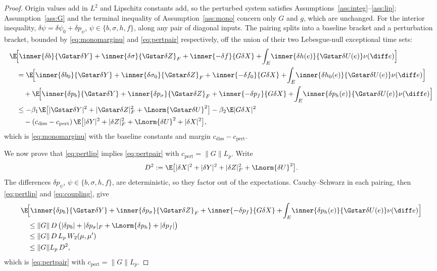 \begin{proof}
Origin values add in $L^2$ and Lipschitz constants add, so the perturbed system satisfies
Assumptions~\ref{ass:integ}--\ref{ass:lip}; Assumption~\ref{ass:G} and the terminal
inequality of Assumption~\ref{ass:mono} concern only $G$ and $g$, which are unchanged.
For the interior inequality, $\delta\psi=\delta\psi_0+\delta p_\psi$,
$\psi\in\{b,\sigma,h,f\}$, along any pair of diagonal inputs.
The pairing splits into a baseline bracket and a perturbation bracket, bounded by
\eqref{eq:monomarginu} and \eqref{eq:pertpair} respectively, off the union of their two
Lebesgue-null exceptional time sets:
\[
\begin{aligned}
&\E\!\Big[\inner{\delta b}{\Gstar\delta Y}+\inner{\delta\sigma}{\Gstar\delta Z}_F
+\inner{-\delta f}{G\delta X}+\!\int_E\!\inner{\delta h(e)}{\Gstar\delta U(e)}\nu(\diff e)\Big]\\
&\quad=\E\!\Big[\inner{\delta b_0}{\Gstar\delta Y}+\inner{\delta\sigma_0}{\Gstar\delta Z}_F
+\inner{-\delta f_0}{G\delta X}+\!\int_E\!\inner{\delta h_0(e)}{\Gstar\delta U(e)}\nu(\diff e)\Big]\\
&\qquad+\E\!\Big[\inner{\delta p_b}{\Gstar\delta Y}+\inner{\delta p_\sigma}{\Gstar\delta Z}_F
+\inner{-\delta p_f}{G\delta X}+\!\int_E\!\inner{\delta p_h(e)}{\Gstar\delta U(e)}\nu(\diff e)\Big]\\
&\quad\le-\beta_1\E\big[|\Gstar\delta Y|^2+|\Gstar\delta Z|_F^2+\Lnorm{\Gstar\delta U}^2\big]-\beta_2\E|G\delta X|^2\\
&\qquad-(c_{\mathrm{diss}}-c_{\mathrm{pert}})\,\E\big[|\delta Y|^2+|\delta Z|_F^2+\Lnorm{\delta U}^2+|\delta X|^2\big] ,
\end{aligned}
\]
which is \eqref{eq:monomarginu} with the baseline constants and margin
$c_{\mathrm{diss}}-c_{\mathrm{pert}}$.

We now prove that \eqref{eq:pertlip} implies \eqref{eq:pertpair} with
$c_{\mathrm{pert}}=\|G\|L_p$. Write
\[
D^2:=\E\big[|\delta X|^2+|\delta Y|^2+|\delta Z|_F^2+\Lnorm{\delta U}^2\big].
\]
The differences $\delta p_\psi$,
$\psi\in\{b,\sigma,h,f\}$, are deterministic, so they factor out of the expectations.
Cauchy--Schwarz in each pairing, then \eqref{eq:pertlip} and \eqref{eq:coupling}, give
\[
\begin{aligned}
&\E\!\Big[\inner{\delta p_b}{\Gstar\delta Y}+\inner{\delta p_\sigma}{\Gstar\delta Z}_F
+\inner{-\delta p_f}{G\delta X}+\!\int_E\!\inner{\delta p_h(e)}{\Gstar\delta U(e)}\nu(\diff e)\Big]\\
&\quad\le\|G\|\,D\,\bigl(|\delta p_b|+|\delta p_\sigma|_F+\Lnorm{\delta p_h}+|\delta p_f|\bigr)\\
&\quad\le\|G\|\,D\,L_p\,W_2(\mu,\mu')\\
&\quad\le\|G\|L_p\,D^2 ,
\end{aligned}
\]
which is \eqref{eq:pertpair} with $c_{\mathrm{pert}}=\|G\|L_p$.
\end{proof}
